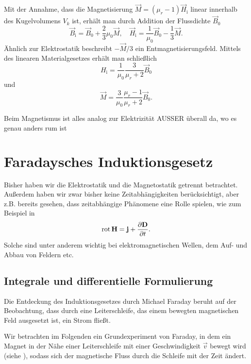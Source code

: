 \begin{itemize}
	      Mit der Annahme, dass die Magnetisierung $\vec {M}=\left(\mu _{r}-1\right)\vec {H}_{\mathrm{i}}$ linear innerhalb des Kugelvolumens $V_{k}$ ist, erhält man durch Addition der Flussdichte $\vec {B}_{0}$
	      \begin{equation*}
		      \vec {B}_{\mathrm{i}}=\vec {B}_{0}+\frac{2}{3}\mu _{0}\vec {M},\quad \vec {H}_{\mathrm{i}}=\frac{1}{\mu _{0}}\vec {B}_{0}-\frac{1}{3}\vec {M}.
	      \end{equation*}
	      Ähnlich zur Elektrostatik beschreibt $-\vec {M}/3$ ein Entmagnetisierungsfeld. Mittels des linearen Materialgesetzes erhält man schließlich
	      \begin{equation*}
		      H_{\mathrm{i}}=\frac{1}{\mu _{0}}\frac{3}{\mu _{r}+2}\vec {B}_{0}
	      \end{equation*}
	      und
	      \begin{equation*}
		      \vec {M}=\frac{3}{\mu _{0}}\frac{\mu _{r}-1}{\mu _{r}+2}\vec {B}_{0}.
	      \end{equation*}
\end{itemize}

Beim Magnetismus ist alles analog zur Elektrizität AUSSER überall da, wo es genau anders rum ist

\section{Faradaysches Induktionsgesetz}

Bisher haben wir die Elektrostatik und die Magnetostatik getrennt betrachtet. Außerdem haben wir zwar bisher keine Zeitabhängigkeiten berücksichtigt, aber z.B. bereits gesehen, dass zeitabhängige Phänomene eine Rolle spielen, wie zum Beispiel in
\begin{equation*}
	\operatorname{rot} \mathbf{H}=\mathbf{j}+\frac{\partial \mathbf{D}}{\partial t}.
\end{equation*}
Solche sind unter anderem wichtig bei elektromagnetischen Wellen, dem Auf- und Abbau von Feldern etc.

\subsection{Integrale und differentielle Formulierung}

Die Entdeckung des Induktionsgesetzes durch Michael Faraday beruht auf der Beobachtung, dass durch eine Leiterschleife, das einem bewegten magnetischen Feld ausgesetzt ist, ein Strom fließt.

Wir betrachten im Folgenden ein Grundexperiment von Faraday, in dem ein Magnet in der Nähe einer Leiterschleife mit einer Geschwindigkeit $\vec v$ bewegt wird (siehe ), sodass sich der magnetische Fluss durch die Schleife mit der Zeit ändert.

